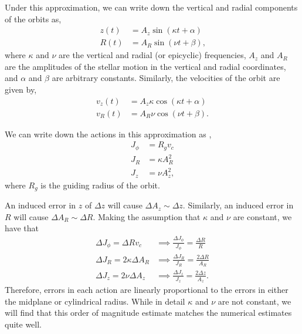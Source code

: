 \documentclass[twocolumn]{aastex62}
\newcommand{\beq}{\begin{equation}}
\newcommand{\eeq}{\end{equation}}
\begin{document}
Under this approximation, we can write down the vertical and radial components
of the orbits as,
\beq\label{eq:orbits_epi}
\begin{split}
z(t) &= A_z \sin{(\kappa t + \alpha)}\\
R(t) &= A_R \sin{(\nu t + \beta)}\text{,}
\end{split}
\eeq
where $\kappa$ and $\nu$ are the vertical and radial (or epicyclic)
frequencies, $A_z$ and $A_R$ are the amplitudes of the stellar motion in the
vertical and radial coordinates, and $\alpha$ and $\beta$ are arbitrary
constants. Similarly, the velocities of the orbit are given by,
\beq\label{eq:orbits_vel_epi}
\begin{split}
v_z(t) &= A_z \kappa \cos{(\kappa t + \alpha)}\\
v_R(t) &= A_R \nu \cos{(\nu t + \beta)}\text{.}
\end{split}
\eeq

We can write down the actions in this approximation as
\citep[Section~3.5.3b][]{2008gady.book.....B},
\beq\label{eq:actions_epi}
\begin{split}
J_{\phi} &= R_g v_c \\
J_R &= \kappa A_R^2 \\
J_z &= \nu A_z^2\text{,}
\end{split}
\eeq
where $R_g$ is the guiding radius of the orbit.

An induced error in $z$ of $\Delta z$ will cause $\Delta A_z \sim \Delta z$.
Similarly, an induced error in $R$ will cause $\Delta A_R \sim \Delta R$.
Making the assumption that $\kappa$ and $\nu$ are constant, we have that
\beq\label{eq:actions_epi_error}
\begin{split}
\Delta J_{\phi} = \Delta R v_c &\implies \frac{\Delta J_{\phi}}{J_{\phi}} = \frac{\Delta R}{R} \\
\Delta J_R = 2 \kappa \Delta A_R &\implies \frac{\Delta J_R}{J_R} = \frac{2\Delta R}{A_R} \\
\Delta J_z = 2 \nu \Delta A_z &\implies \frac{\Delta J_z}{J_z} = \frac{2\Delta z}{A_z}\text{.}
\end{split}
\eeq
Therefore, errors in each action are linearly proportional to the errors in
either the midplane or cylindrical radius. While in detail $\kappa$ and $\nu$
are not constant, we will find that this order of magnitude estimate matches
the numerical estimates quite well.
\end{document}
